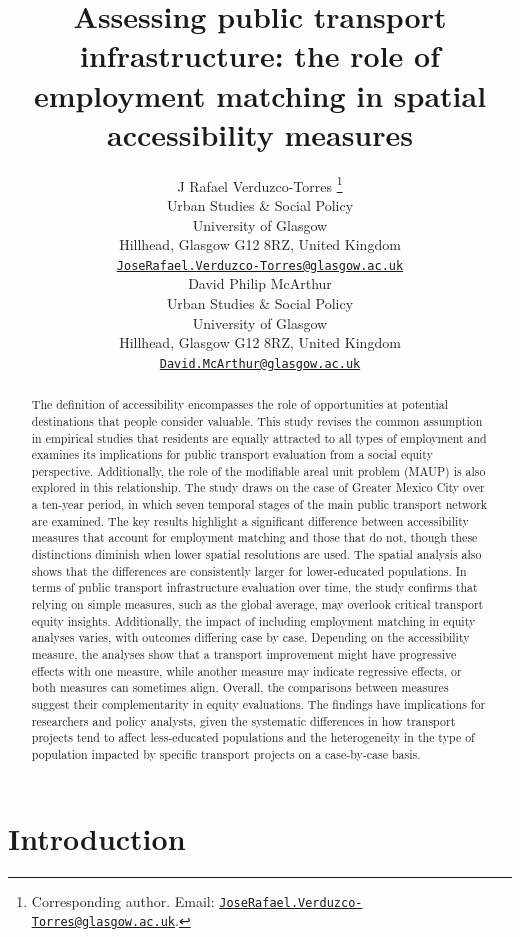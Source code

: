 \documentclass{article}
\title{Assessing public transport infrastructure: the role of employment
matching in spatial accessibility measures}
\author{
    J Rafael Verduzco-Torres
    \thanks{Corresponding author. Email:
\href{mailto:JoseRafael.Verduzco-Torres@glasgow.ac.uk}{\nolinkurl{JoseRafael.Verduzco-Torres@glasgow.ac.uk}}.}
   \\
    Urban Studies \& Social Policy \\
    University of Glasgow \\
  Hillhead, Glasgow G12 8RZ, United Kingdom \\
  \texttt{\href{mailto:JoseRafael.Verduzco-Torres@glasgow.ac.uk}{\nolinkurl{JoseRafael.Verduzco-Torres@glasgow.ac.uk}}} \\
   \And
    David Philip McArthur
   \\
    Urban Studies \& Social Policy \\
    University of Glasgow \\
  Hillhead, Glasgow G12 8RZ, United Kingdom \\
  \texttt{\href{mailto:David.McArthur@glasgow.ac.uk}{\nolinkurl{David.McArthur@glasgow.ac.uk}}} \\
  }
\begin{document}
\maketitle


\begin{abstract}
The definition of accessibility encompasses the role of opportunities at
potential destinations that people consider valuable. This study revises
the common assumption in empirical studies that residents are equally
attracted to all types of employment and examines its implications for
public transport evaluation from a social equity perspective.
Additionally, the role of the modifiable areal unit problem (MAUP) is
also explored in this relationship. The study draws on the case of
Greater Mexico City over a ten-year period, in which seven temporal
stages of the main public transport network are examined. The key
results highlight a significant difference between accessibility
measures that account for employment matching and those that do not,
though these distinctions diminish when lower spatial resolutions are
used. The spatial analysis also shows that the differences are
consistently larger for lower-educated populations. In terms of public
transport infrastructure evaluation over time, the study confirms that
relying on simple measures, such as the global average, may overlook
critical transport equity insights. Additionally, the impact of
including employment matching in equity analyses varies, with outcomes
differing case by case. Depending on the accessibility measure, the
analyses show that a transport improvement might have progressive
effects with one measure, while another measure may indicate regressive
effects, or both measures can sometimes align. Overall, the comparisons
between measures suggest their complementarity in equity evaluations.
The findings have implications for researchers and policy analysts,
given the systematic differences in how transport projects tend to
affect less-educated populations and the heterogeneity in the type of
population impacted by specific transport projects on a case-by-case
basis.
\end{abstract}


\section{Introduction}\label{introduction}
\end{document}
